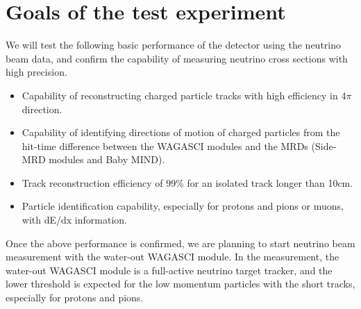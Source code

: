 \section{Goals of the test experiment}
\label{sec:goals}
We will test the following basic performance of the detector using the neutrino beam data,
and confirm the capability of measuring neutrino cross sections with high precision.
\begin{itemize}
\item Capability of reconstructing charged particle tracks with high efficiency in 4$\pi$ direction.
\item Capability of identifying directions of motion of charged particles from the hit-time difference between the WAGASCI modules and the MRDs (Side-MRD modules and Baby MIND).
\item Track reconstruction efficiency of 99\% for an isolated track longer than 10cm.
\item Particle identification capability, especially for protons and pions or muons, with dE/dx information.
\end{itemize}
Once the above performance is confirmed, we are planning to start neutrino beam measurement with the water-out WAGASCI module.
In the measurement, the water-out WAGASCI module is a full-active neutrino target tracker, and the lower threshold is expected for the low momentum particles with the short tracks, especially for protons and pions.
